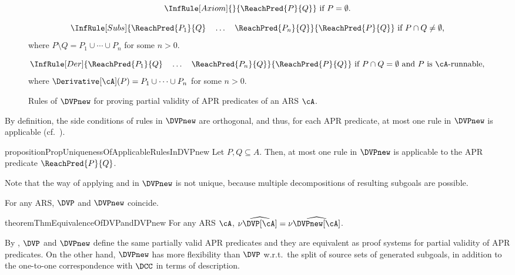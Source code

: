 \begin{figure}[t]
	\begin{minipage}[t]{.4\textwidth}
		\[
			\InfRule[Axiom]{}{\ReachPred{P}{Q}
			}
			~\mbox{if $P = \emptyset$.}
		\]
	\end{minipage}
	\begin{minipage}[t]{.59\textwidth}
		\[
			\InfRule[Subs]{\ReachPred{P_1}{Q}
				\quad
				\ldots
				\quad
				\ReachPred{P_n}{Q}
			}{\ReachPred{P}{Q}
			}
			~\mbox{if $P \cap Q  \ne \emptyset$,}
		\]
		\qquad
		where $P \setminus Q = P_1 \cup \cdots \cup P_n$ for some $n > 0$.
	\end{minipage}

	\begin{minipage}{.99\textwidth}
		\[
			\InfRule[Der]{\ReachPred{P_1}{Q}
				\quad
				\ldots
				\quad
				\ReachPred{P_n}{Q}
			}{\ReachPred{P}{Q}
			}
			~\mbox{if $P \cap Q = \emptyset$ and $P$ is $\cA$-runnable,}
		\]
		\qquad
		where $\Derivative[\cA](P) = P_1 \cup \cdots \cup P_n$ for some $n > 0$.
	\end{minipage}

	\caption{Rules of $\DVPnew$ for proving partial validity of APR predicates of an ARS $\cA$.}
	\label{fig:rules-of-DVPnew}
\end{figure}

By definition, the side conditions of rules in $\DVPnew$ are orthogonal, and thus,
for each APR predicate, at most one rule in $\DVPnew$ is applicable (cf.~\cite{KN24jip}).
\begin{restatable}{proposition}{PropUniquenessOfApplicableRulesInDVPnew}
	\label{prop:uniqueness-of-applicable-rules-in-DVPnew}
	Let $P,Q \subseteq A$.
	Then, at most one rule in $\DVPnew$ is applicable to the APR predicate $\ReachPred{P}{Q}$.
\end{restatable}
Note that the way of applying  and  in $\DVPnew$ is not unique, because multiple decompositions of resulting subgoals are possible.

For any ARS, $\DVP$ and $\DVPnew$ coincide.
\begin{restatable}{theorem}{ThmEquivalenceOfDVPandDVPnew}
	\label{thm:equivalence-of-DVP-and-DVPnew}
	For any ARS $\cA$, $\nu\widehat{\DVP[\cA]} = \nu\widehat{\DVPnew[\cA]}$.
\end{restatable}
By , $\DVP$ and $\DVPnew$ define the same partially valid APR predicates and they are equivalent as proof systems for partial validity of APR predicates.
On the other hand, $\DVPnew$ has more flexibility than $\DVP$ w.r.t.\ the split of source sets of generated subgoals, in addition to the one-to-one correspondence with $\DCC$ in terms of description.


